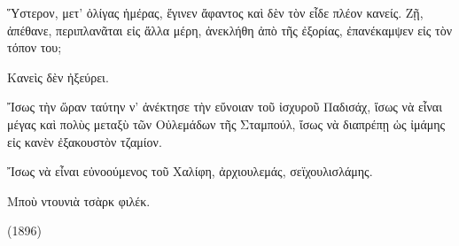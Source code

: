 \documentclass[11pt]{article}
\begin{document}
Ὕστερον, μετ' ὀλίγας ἡμέρας, ἔγινεν ἄφαντος καὶ δὲν τὸν εἶδε πλέον κανείς. Ζῇ, ἀπέθανε, περιπλανᾶται εἰς ἄλλα μέρη, ἀνεκλήθη ἀπὸ τῆς ἐξορίας, ἐπανέκαμψεν εἰς τὸν τόπον του;

Κανεὶς δὲν ἠξεύρει.

Ἴσως τὴν ὥραν ταύτην ν' ἀνέκτησε τὴν εὔνοιαν τοῦ ἰσχυροῦ Παδισάχ, ἴσως νὰ εἶναι μέγας καὶ πολὺς μεταξὺ τῶν Οὐλεμάδων τῆς Σταμπούλ, ἴσως νὰ διαπρέπῃ ὡς ἰμάμης εἰς κανὲν ἐξακουστὸν τζαμίον.

Ἴσως νὰ εἶναι εὐνοούμενος τοῦ Χαλίφη, ἀρχιουλεμάς, σεϊχουλισλάμης.

Μποὺ ντουνιὰ τσὰρκ φιλέκ.

(1896)
\end{document}
